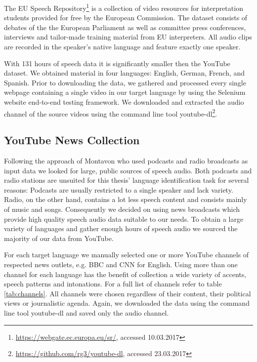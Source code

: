 	The EU Speech Repository\footnote{\url{https://webgate.ec.europa.eu/sr/}, accessed 10.03.2017} is a collection of video resources for interpretation students provided for free by the European Commission. The dataset consists of debates of the the European Parliament as well as committee press conferences, interviews and tailor-made training material from EU interpreters. All audio clips are recorded in the speaker's native language and feature exactly one speaker.
	
		With 131 hours of speech data it is significantly smaller then the YouTube dataset. We obtained material in four languages: English, German, French, and Spanish. Prior to downloading the data, we gathered and processed every single webpage containing a single video in our target language by using the Selenium website end-to-end testing framework. We downloaded and extracted the audio channel of the source videos using the command line tool youtube-dl\footnote{\url{https://github.com/rg3/youtube-dl}, accessed 23.03.2017}.

\subsection{YouTube News Collection}
\label{sec:youtube_news}

	Following the approach of Montavon \cite{montavon2009deep} who used podcasts and radio broadcasts as input data we looked for large, public sources of speech audio. Both podcasts and radio stations are unsuited for this thesis' language identification task for several reasons: Podcasts are usually restricted to a single speaker and lack variety. Radio, on the other hand, contains a lot less speech content and consists mainly of music and songs. Consequently we decided on using news broadcasts which provide high quality speech audio data suitable to our needs. To obtain a large variety of languages and gather enough hours of speech audio we sourced the majority of our data from YouTube. 
	
	For each target language we manually selected one or more YouTube channels of respected news outlets, e.g. BBC and CNN for English. Using more than one channel for each language has the benefit of collection a wide variety of accents, speech patterns and intonations. For a full list of channels refer to table \ref{tab:channels}. All channels were chosen regardless of their content, their political views or journalistic agenda. Again, we downloaded the data using the command line tool youtube-dl and saved only the audio channel.
	
